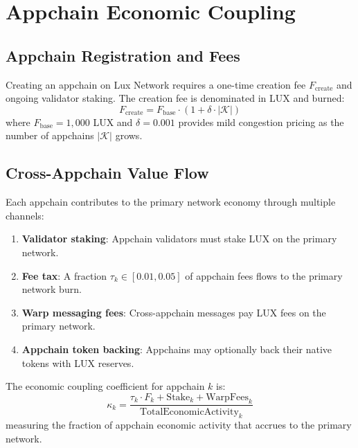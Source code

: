 \section{Appchain Economic Coupling}
\label{sec:appchain}

\subsection{Appchain Registration and Fees}

Creating an appchain on Lux Network requires a one-time creation fee $F_{\text{create}}$ and ongoing validator staking. The creation fee is denominated in LUX and burned:
\begin{equation}
    F_{\text{create}} = F_{\text{base}} \cdot (1 + \delta \cdot |\mathcal{K}|)
\end{equation}
where $F_{\text{base}} = 1{,}000$ LUX and $\delta = 0.001$ provides mild congestion pricing as the number of appchains $|\mathcal{K}|$ grows.

\subsection{Cross-Appchain Value Flow}

Each appchain contributes to the primary network economy through multiple channels:

\begin{enumerate}[label=(\arabic*)]
    \item \textbf{Validator staking}: Appchain validators must stake LUX on the primary network.
    \item \textbf{Fee tax}: A fraction $\tau_k \in [0.01, 0.05]$ of appchain fees flows to the primary network burn.
    \item \textbf{Warp messaging fees}: Cross-appchain messages pay LUX fees on the primary network.
    \item \textbf{Appchain token backing}: Appchains may optionally back their native tokens with LUX reserves.
\end{enumerate}

\begin{definition}
The economic coupling coefficient for appchain $k$ is:
\begin{equation}
    \kappa_k = \frac{\tau_k \cdot F_k + \text{Stake}_k + \text{WarpFees}_k}{\text{TotalEconomicActivity}_k}
\end{equation}
measuring the fraction of appchain economic activity that accrues to the primary network.
\end{definition}

